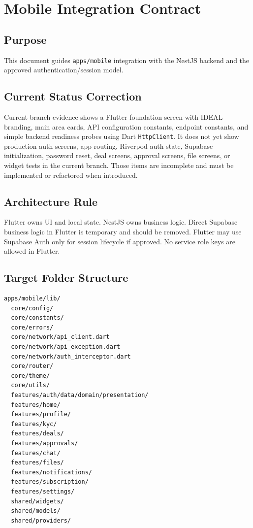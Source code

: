 \chapter*{Mobile Integration Contract}

\section*{Purpose}
This document guides \texttt{apps/mobile} integration with the NestJS backend and the approved authentication/session model.

\section*{Current Status Correction}
Current branch evidence shows a Flutter foundation screen with IDEAL branding, main area cards, API configuration constants, endpoint constants, and simple backend readiness probes using Dart \texttt{HttpClient}. It does not yet show production auth screens, app routing, Riverpod auth state, Supabase initialization, password reset, deal screens, approval screens, file screens, or widget tests in the current branch. Those items are incomplete and must be implemented or refactored when introduced.

\section*{Architecture Rule}
Flutter owns UI and local state. NestJS owns business logic. Direct Supabase business logic in Flutter is temporary and should be removed. Flutter may use Supabase Auth only for session lifecycle if approved. No service role keys are allowed in Flutter.

\section*{Target Folder Structure}
\begin{verbatim}
apps/mobile/lib/
  core/config/
  core/constants/
  core/errors/
  core/network/api_client.dart
  core/network/api_exception.dart
  core/network/auth_interceptor.dart
  core/router/
  core/theme/
  core/utils/
  features/auth/data/domain/presentation/
  features/home/
  features/profile/
  features/kyc/
  features/deals/
  features/approvals/
  features/chat/
  features/files/
  features/notifications/
  features/subscription/
  features/settings/
  shared/widgets/
  shared/models/
  shared/providers/
\end{verbatim}


